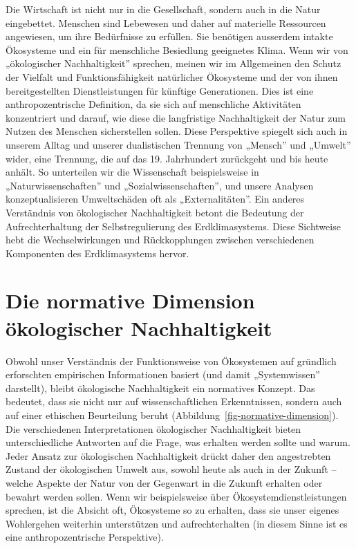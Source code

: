 \documentclass[
  nswissgerman,
  a4paper,
  DIV=11,
  numbers=noendperiod,
  oneside,
  openany]{scrreprt}
\begin{document}
Die Wirtschaft ist nicht nur in die Gesellschaft, sondern auch in die
Natur eingebettet. Menschen sind Lebewesen und daher auf materielle
Ressourcen angewiesen, um ihre Bedürfnisse zu erfüllen. Sie benötigen
ausserdem intakte Ökosysteme und ein für menschliche Besiedlung
geeignetes Klima. Wenn wir von „ökologischer Nachhaltigkeit'' sprechen,
meinen wir im Allgemeinen den Schutz der Vielfalt und Funktionsfähigkeit
natürlicher Ökosysteme und der von ihnen bereitgestellten
Dienstleistungen für künftige Generationen. Dies ist eine
anthropozentrische Definition, da sie sich auf menschliche Aktivitäten
konzentriert und darauf, wie diese die langfristige Nachhaltigkeit der
Natur zum Nutzen des Menschen sicherstellen sollen. Diese Perspektive
spiegelt sich auch in unserem Alltag und unserer dualistischen Trennung
von „Mensch'' und „Umwelt'' wider, eine Trennung, die auf das 19.
Jahrhundert zurückgeht und bis heute anhält. So unterteilen wir die
Wissenschaft beispielsweise in „Naturwissenschaften'' und
„Sozialwissenschaften'', und unsere Analysen konzeptualisieren
Umweltschäden oft als „Externalitäten''. Ein anderes Verständnis von
ökologischer Nachhaltigkeit betont die Bedeutung der Aufrechterhaltung
der Selbstregulierung des Erdklimasystems. Diese Sichtweise hebt die
Wechselwirkungen und Rückkopplungen zwischen verschiedenen Komponenten
des Erdklimasystems hervor.

\section{Die normative Dimension ökologischer
Nachhaltigkeit}\label{die-normative-dimension-uxf6kologischer-nachhaltigkeit}

Obwohl unser Verständnis der Funktionsweise von Ökosystemen auf
gründlich erforschten empirischen Informationen basiert (und damit
„Systemwissen'' darstellt), bleibt ökologische Nachhaltigkeit ein
normatives Konzept. Das bedeutet, dass sie nicht nur auf
wissenschaftlichen Erkenntnissen, sondern auch auf einer ethischen
Beurteilung beruht (Abbildung~\ref{fig-normative-dimension}). Die
verschiedenen Interpretationen ökologischer Nachhaltigkeit bieten
unterschiedliche Antworten auf die Frage, was erhalten werden sollte und
warum. Jeder Ansatz zur ökologischen Nachhaltigkeit drückt daher den
angestrebten Zustand der ökologischen Umwelt aus, sowohl heute als auch
in der Zukunft -- welche Aspekte der Natur von der Gegenwart in die
Zukunft erhalten oder bewahrt werden sollen. Wenn wir beispielsweise
über Ökosystemdienstleistungen sprechen, ist die Absicht oft, Ökosysteme
so zu erhalten, dass sie unser eigenes Wohlergehen weiterhin
unterstützen und aufrechterhalten (in diesem Sinne ist es eine
anthropozentrische Perspektive).
\end{document}
